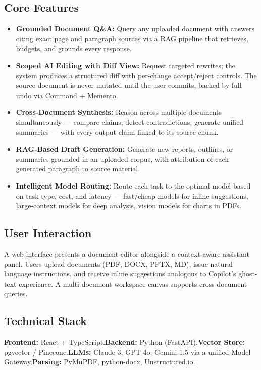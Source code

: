 \documentclass[10pt]{article}
\begin{document}
\subsection{Core Features}
\begin{itemize}
  \item \textbf{Grounded Document Q\&A:} Query any uploaded document with answers citing exact page and paragraph sources via a RAG pipeline that retrieves, budgets, and grounds every response.
  \item \textbf{Scoped AI Editing with Diff View:} Request targeted rewrites; the system produces a structured diff with per-change accept/reject controls. The source document is never mutated until the user commits, backed by full undo via Command + Memento.
  \item \textbf{Cross-Document Synthesis:} Reason across multiple documents simultaneously --- compare claims, detect contradictions, generate unified summaries --- with every output claim linked to its source chunk.
  \item \textbf{RAG-Based Draft Generation:} Generate new reports, outlines, or summaries grounded in an uploaded corpus, with attribution of each generated paragraph to source material.
  \item \textbf{Intelligent Model Routing:} Route each task to the optimal model based on task type, cost, and latency --- fast/cheap models for inline suggestions, large-context models for deep analysis, vision models for charts in PDFs.
\end{itemize}

\subsection{User Interaction}
A web interface presents a document editor alongside a context-aware assistant panel. Users upload documents (PDF, DOCX, PPTX, MD), issue natural language instructions, and receive inline suggestions analogous to Copilot's ghost-text experience. A multi-document workspace canvas supports cross-document queries.

\subsection{Technical Stack}
\textbf{Frontend:} React + TypeScript.\quad \textbf{Backend:} Python (FastAPI).\quad \textbf{Vector Store:} pgvector / Pinecone.\quad \textbf{LLMs:} Claude 3, GPT-4o, Gemini 1.5 via a unified Model Gateway.\quad \textbf{Parsing:} PyMuPDF, python-docx, Unstructured.io.
\end{document}
